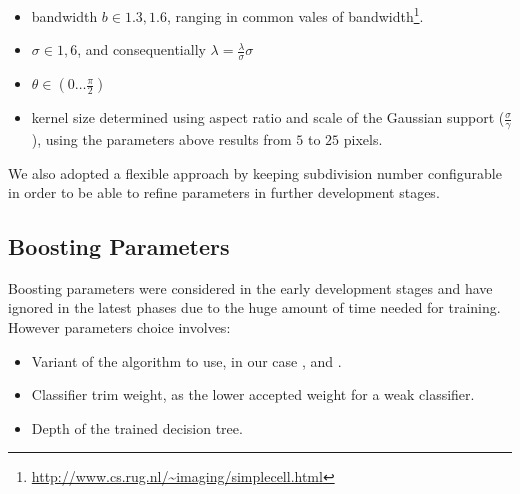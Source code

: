 \begin{itemize}
  \item bandwidth $b \in 1.3,1.6$, %
    ranging in common vales of bandwidth\cite{gaborBandwidth}\footnote{\url{http://www.cs.rug.nl/~imaging/simplecell.html}}.
  \item $\sigma \in 1,6$, and consequentially $\lambda = \frac{\lambda}{\sigma} \sigma $ 
  \item $\theta \in ( 0 \ldots \frac{\pi}{2} )$
  \item kernel size determined using aspect ratio and scale of the Gaussian support ($\frac{\sigma}{\gamma}$), using the parameters above results from $5$ to $25$ pixels.
\end{itemize}

We also adopted a flexible approach by keeping subdivision number configurable in order to be able to refine parameters in further development stages. 

\subsection{Boosting Parameters}

Boosting parameters were considered in the early development stages and have ignored in the latest phases due to the huge amount of time needed for  training. However parameters choice involves:

\begin{itemize}
\item Variant of the algorithm to use, in our case ,  and .
\item Classifier trim weight, as the lower accepted weight for a weak classifier.
\item Depth of the trained decision tree.
\end{itemize}

